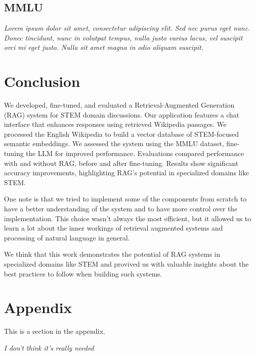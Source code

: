\documentclass[11pt]{article}
\begin{document}
\subsection{MMLU}
\textit{Lorem ipsum dolor sit amet, consectetur adipiscing elit. Sed nec purus eget
nunc. Donec tincidunt, nunc in volutpat tempus, nulla justo varius lacus, vel
suscipit orci mi eget justo. Nulla sit amet magna in odio aliquam suscipit.}

\section{Conclusion}
We developed, fine-tuned, and evaluated a Retrieval-Augmented Generation (RAG) 
system for STEM domain discussions. Our application features a chat interface 
that enhances responses using retrieved Wikipedia passages. We processed the 
English Wikipedia to build a vector database of STEM-focused semantic 
embeddings. 
We assessed the system using the MMLU 
dataset, fine-tuning the LLM for improved performance. Evaluations compared 
performance with and without RAG, before and after fine-tuning.
Results show significant accuracy improvements, highlighting RAG's potential 
in specialized domains like STEM.

One note is that we tried to implement some of the components from scratch
to have a better understanding of the system and to have more control over the
implementation.
This choice wasn't always the most efficient, but it allowed us to learn a lot
about the inner workings of retrieval augmented systems and processing of natural 
language in general. 

We think that this work demonstrates the potential of RAG systems in specialized 
domains like STEM and provived us with valuable insights about the best practices 
to follow when building such systems.




\appendix

\section{Appendix}
\label{sec:appendix}

This is a section in the appendix.

\textit{I don't think it's really needed}
\end{document}
